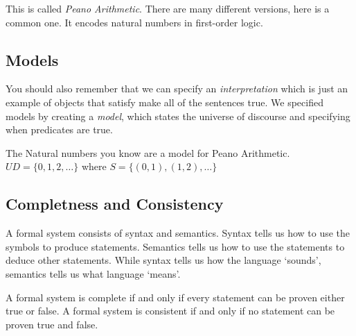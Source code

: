 \documentclass[11pt, letterpaper, twoside, openright]{book}
\begin{document}
This is called \textit{Peano Arithmetic}. There are many different versions, here is a common one. It encodes natural numbers in first-order logic.

\subsection{Models}
You should also remember that we can specify an \textit{interpretation} which is just an example of objects that satisfy make all of the sentences true. We specified models by creating a \textit{model}, which states the universe of discourse and specifying when predicates are true.

The Natural numbers you know are a model for Peano Arithmetic. $UD = \{0, 1, 2, \ldots\}$ where $S = \{(0, 1), (1, 2), \ldots\}$


\subsection{Completness and Consistency}
A formal system consists of syntax and semantics. Syntax tells us how to use the symbols to produce statements. Semantics tells us how to use the statements to deduce other statements. While syntax tells us how the language `sounds', semantics tells us what language `means'.

A formal system is complete if and only if every statement can be proven either true or false. A formal system is consistent if and only if no statement can be proven true and false.

\end{document}
